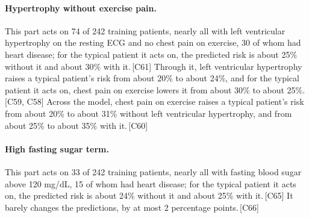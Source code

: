 \documentclass[a4paper,10pt]{article}
\newif\ifreviewmarks
\newcommand{\reviewrule}{\noindent{\color{BrickRed}\rule{\linewidth}{0.8pt}}}
\newenvironment{drafted}[1][]{%
  \ifreviewmarks\par\addvspace{\medskipamount}\reviewrule\par\nopagebreak
  \noindent{\color{BrickRed}\sffamily\footnotesize\textbf{Thesis Draft}\quad #1\hfill review}\par\nopagebreak\smallskip\fi}{%
  \ifreviewmarks\par\smallskip\noindent{\color{BrickRed}\sffamily\footnotesize end of thesis draft}\par\nopagebreak\reviewrule\par\medskip\fi}
\begin{document}
\begin{drafted}[plain-language layer: heart-s5-c2]
\paragraph{Hypertrophy without exercise pain.} This part acts on 74 of 242 training patients, nearly all with left ventricular hypertrophy on the resting ECG and no chest pain on exercise, 30 of whom had heart disease; for the typical patient it acts on, the predicted risk is about 25\% without it and about 30\% with it.\,{\scriptsize\textcolor{NavyBlue}{[C61]}} Through it, left ventricular hypertrophy raises a typical patient's risk from about 20\% to about 24\%, and for the typical patient it acts on, chest pain on exercise lowers it from about 30\% to about 25\%.\,{\scriptsize\textcolor{NavyBlue}{[C59, C58]}} Across the model, chest pain on exercise raises a typical patient's risk from about 20\% to about 31\% without left ventricular hypertrophy, and from about 25\% to about 35\% with it.\,{\scriptsize\textcolor{NavyBlue}{[C60]}}
\paragraph{High fasting sugar term.} This part acts on 33 of 242 training patients, nearly all with fasting blood sugar above 120 mg/dL, 15 of whom had heart disease; for the typical patient it acts on, the predicted risk is about 24\% without it and about 25\% with it.\,{\scriptsize\textcolor{NavyBlue}{[C65]}} It barely changes the predictions, by at most 2 percentage points.\,{\scriptsize\textcolor{NavyBlue}{[C66]}}

\end{drafted}
\end{document}
